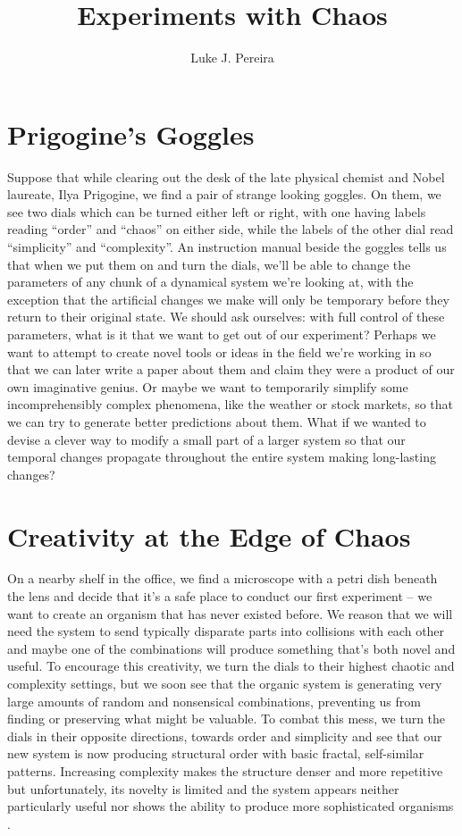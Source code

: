 \documentclass{article}
\title{\vspace{-3cm} Experiments with Chaos }
\author{Luke J. Pereira}
\date{}
\begin{document}
\maketitle

\section{Prigogine's Goggles}
Suppose that while clearing out the desk of the late physical chemist and Nobel laureate, Ilya Prigogine, we find a pair of strange looking goggles. On them, we see two dials which can be turned either left or right, with one having labels reading ``order'' and ``chaos'' on either side, while the labels of the other dial read ``simplicity'' and ``complexity''. An instruction manual beside the goggles tells us that when we put them on and turn the dials, we'll be able to change the parameters of any chunk of a dynamical system we're looking at, with the exception that the artificial changes we make will only be temporary before they return to their original state. We should ask ourselves: with full control of these parameters, what is it that we want to get out of our experiment? Perhaps we want to attempt to create novel tools or ideas in the field we're working in so that we can later write a paper about them and claim they were a product of our own imaginative genius. Or maybe we want to temporarily simplify some incomprehensibly complex phenomena, like the weather or stock markets, so that we can try to generate better predictions about them. What if we wanted to devise a clever way to modify a small part of a larger system so that our temporal changes propagate throughout the entire system making long-lasting changes? 

\section{Creativity at the Edge of Chaos}

On a nearby shelf in the office, we find a microscope with a petri dish beneath the lens and decide that it's a safe place to conduct our first experiment -- we want to create an organism that has never existed before. We reason that we will need the system to send typically disparate parts into collisions with each other and maybe one of the combinations will produce something that's both novel and useful. To encourage this creativity, we turn the dials to their highest chaotic and complexity settings, but we soon see that the organic system is generating very large amounts of random and nonsensical combinations, preventing us from finding or preserving what might be valuable. To combat this mess, we turn the dials in their opposite directions, towards order and simplicity and see that our new system is now producing structural order with basic fractal, self-similar patterns. Increasing complexity makes the structure denser and more repetitive but unfortunately, its novelty is limited and the system appears neither particularly useful nor shows the ability to produce more sophisticated organisms \cite{eoc}.
\end{document}
